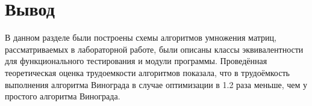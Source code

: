 \section{Вывод}

В данном разделе были построены схемы алгоритмов умножения матриц,
рассматриваемых в лабораторной работе, были описаны классы эквивалентности для функционального тестирования и модули программы. Проведённая теоретическая оценка трудоемкости алгоритмов показала, что в трудоёмкость выполнения алгоритма Винограда в случае оптимизации в 1.2 раза меньше, чем у простого алгоритма Винограда.
